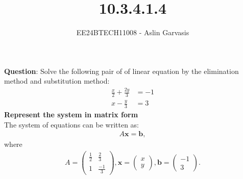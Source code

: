 \documentclass[journal]{IEEEtran}
\begin{document}
	
	
	\vspace{3cm}
	
	\title{10.3.4.1.4}
	\author{EE24BTECH11008 - Aslin Garvasis}
	{\let\newpage\relax\maketitle}
	
	\renewcommand{\thefigure}{\theenumi}
	\renewcommand{\thetable}{\theenumi}
	\setlength{\intextsep}{10pt} %
	
	
	\renewcommand{\thetable}{\theenumi}
	
	
	\textbf{Question}:\newline
	Solve the following pair of of linear equation by the elimination method and substitution method:
    \begin{align}
        \frac{x}{2}+\frac{2y}{3}&=-1\\
        x-\frac{y}{3}&=3
    \end{align}
	\textbf{ Represent the system in matrix form} \\ 
The system of equations can be written as:  
\begin{align}  
A \mathbf{x} = \mathbf{b},  
\end{align}  
where  
\begin{align}  
A = \begin{pmatrix} \frac{1}{2} & \frac{2}{3} \\ 1 & \frac{-1}{3} \end{pmatrix}, \mathbf{x} = \begin{pmatrix} x \\ y \end{pmatrix}, \mathbf{b} = \begin{pmatrix} -1 \\ 3 \end{pmatrix}.  
\end{align}
\end{document}
